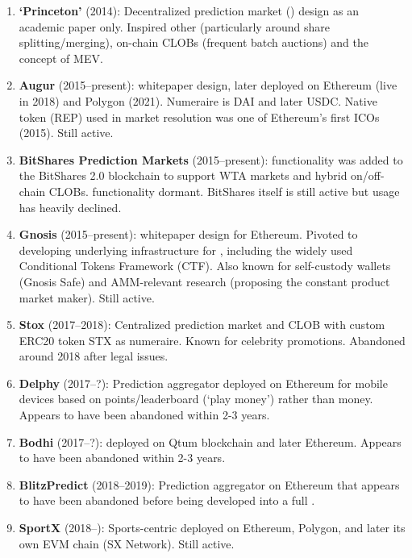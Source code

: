 \begin{enumerate}
\item \textbf{`Princeton' \depm} (2014): Decentralized prediction market (\depm) design as an academic paper only. Inspired other \depms (particularly around share splitting/merging), on-chain CLOBs (frequent batch auctions) and the concept of MEV.  

\item \textbf{Augur} (2015--present): \depm whitepaper design, later deployed on Ethereum (live in 2018) and Polygon (2021). Numeraire is DAI and later USDC. Native token (REP) used in market resolution was one of Ethereum's first ICOs (2015). Still active.

\item \textbf{BitShares Prediction Markets} (2015--present): \depm functionality was added to the BitShares 2.0 blockchain to support WTA markets and hybrid on/off-chain CLOBs. \depm functionality dormant. BitShares itself is still active but usage has heavily declined.
 
\item \textbf{Gnosis} (2015--present): \depm whitepaper design for Ethereum. Pivoted to developing underlying infrastructure for \depms, including the widely used Conditional Tokens Framework (CTF). Also known for self-custody wallets (Gnosis Safe) and AMM-relevant research (proposing the constant product market maker). Still active. 

\item \textbf{Stox} (2017--2018): Centralized prediction market and CLOB with custom ERC20 token STX as numeraire. Known for celebrity promotions. Abandoned around 2018 after legal issues. 

\item \textbf{Delphy} (2017--?): Prediction aggregator deployed on Ethereum for mobile devices based on points/leaderboard (`play money') rather than money. Appears to have been abandoned within 2-3 years.

\item \textbf{Bodhi} (2017--?): \depm deployed on Qtum blockchain and later Ethereum. Appears to have been abandoned within 2-3 years. 

\item \textbf{BlitzPredict} (2018--2019): Prediction aggregator on Ethereum that appears to have been abandoned before being developed into a full \depm.

\item \textbf{SportX} (2018--): Sports-centric \depm deployed on Ethereum, Polygon, and later its own EVM chain (SX Network). Still active.


\end{enumerate}
